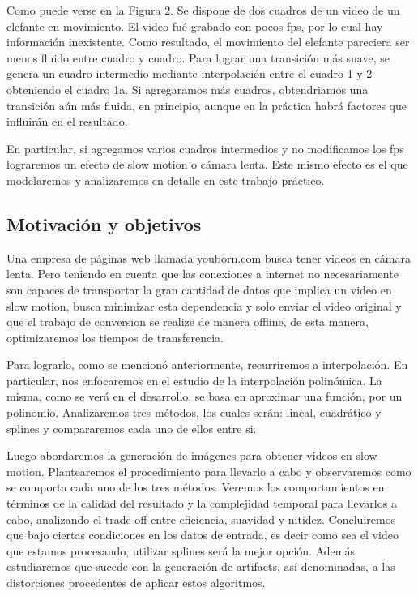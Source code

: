 Como puede verse en la Figura 2. Se dispone de dos cuadros de un video de un elefante en movimiento. El video fué grabado con pocos fps, por lo cual hay información inexistente. Como resultado, el movimiento del elefante pareciera ser menos fluido entre cuadro y cuadro. Para lograr una transición más suave, se genera un cuadro intermedio mediante interpolación entre el cuadro 1 y 2 obteniendo el cuadro 1a. Si agregaramos más cuadros, obtendriamos una transición aún más fluida, en principio, aunque en la práctica habrá factores que influirán en el resultado. 


En particular, si agregamos varios cuadros intermedios y no modificamos los fps lograremos un efecto de slow motion o cámara lenta. Este mismo efecto es el que modelaremos y analizaremos en detalle en este trabajo práctico.

\subsection{Motivación y objetivos}

Una empresa de páginas web llamada youborn.com busca tener videos en cámara lenta. Pero teniendo en cuenta que las conexiones a internet no necesariamente son capaces de transportar la gran cantidad de datos que implica un video en slow motion, busca minimizar esta dependencia y solo enviar el video original y que el trabajo de conversion se realize de manera offline, de esta manera, optimizaremos los tiempos de transferencia. 


Para lograrlo, como se mencionó anteriormente, recurriremos a interpolación.
En particular, nos enfocaremos en el estudio de la interpolación polinómica. 
La misma, como se verá en el desarrollo, se basa en aproximar una función, por un polinomio. Analizaremos tres métodos, los cuales serán: lineal, cuadrático y splines y compararemos cada uno de ellos entre si.

Luego abordaremos la generación de imágenes para obtener videos en slow motion.
Plantearemos el procedimiento para llevarlo a cabo y observaremos como se comporta cada uno de los tres métodos. Veremos los comportamientos en términos de la calidad del resultado y la complejidad temporal para llevarlos a cabo, analizando el trade-off entre eficiencia, suavidad y nitidez. Concluiremos que bajo ciertas condiciones en los datos de entrada, es decir como sea el video que estamos procesando, utilizar splines será la mejor opción. 
Además estudiaremos que sucede con la generación de artifacts, así denominadas, a las distorciones procedentes de aplicar estos algoritmos.


 
